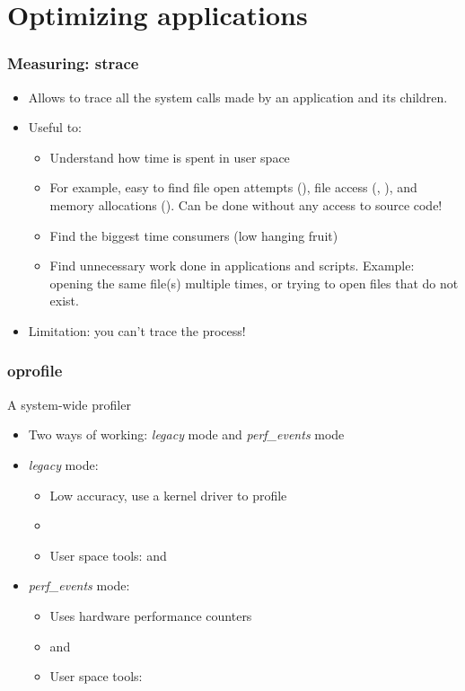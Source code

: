 \section{Optimizing applications}

\begin{frame}
\frametitle{Measuring: strace}
\begin{itemize}
	\item Allows to trace all the system calls made by an
              application and its children.
	\item Useful to:
	\begin{itemize}
		\item Understand how time is spent in user space
		\item For example, easy to find file open attempts (),
		      file access (, ), and
		      memory allocations (). Can be done
		      without any access to source code!
		\item Find the biggest time consumers
		      (low hanging fruit)
		\item Find unnecessary work done in applications
		      and scripts. Example: opening the same file(s)
		      multiple times, or trying to open files that
		      do not exist.
	\end{itemize}
	\item Limitation: you can't trace the  process!
\end{itemize}
\end{frame}



\begin{frame}
\frametitle{oprofile}
A system-wide profiler
\begin{itemize}
	\item Two ways of working: {\em legacy} mode and {\em
              perf\_events} mode
	\item {\em legacy} mode:
	\begin{itemize}
		\item Low accuracy, use a kernel driver to profile
		\item {}
		\item User space tools:  and 
	\end{itemize}
	\item {\em perf\_events} mode:
	\begin{itemize}
		\item Uses hardware performance counters
		\item {} and 
		\item User space tools: 
	\end{itemize}
\end{itemize}
\end{frame}

